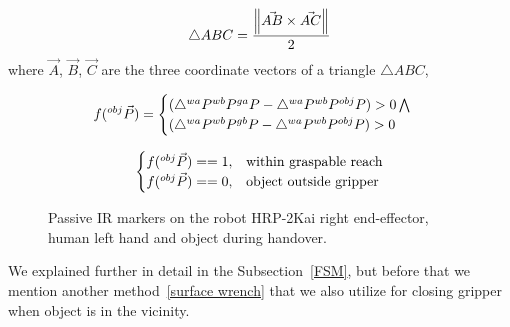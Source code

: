 \documentclass[a4paper, 12pt, oneside]{Thesis}  %
\begin{document}

\begin{equation}\label{area general}
        \triangle{ABC} = \frac{\norm{ \vec{AB} \times \vec{AC} }} {2} \\
\end{equation}
where $\vec{A}$, $\vec{B}$, $\vec{C}$ are the three coordinate vectors of a triangle $\triangle{ABC}$,


\begin{equation}\label{area}
    \centering
    f({}^{obj}\vec{P}) = 
    \begin{cases}
     (\triangle{{}^{wa}P {}^{wb}P {}^{ga}P} - \triangle{{}^{wa}P {}^{wb}P {}^{obj}P}) > 0 \bigwedge \\
     (\triangle{{}^{wa}P {}^{wb}P {}^{gb}P} - \triangle{{}^{wa}P {}^{wb}P {}^{obj}P}) > 0
   \end{cases}         
\end{equation}

\begin{equation}\label{area bool}
    \centering
    \begin{cases}
     f({}^{obj}\vec{P})==1, & \text{within graspable reach}  \\
     f({}^{obj}\vec{P})==0, & \text{object outside gripper}
   \end{cases}         
\end{equation}





\begin{figure}[ht]
	\caption{Passive IR markers on the robot HRP-2Kai right end-effector, human left hand and object during handover.}
	\label{fig:markerEf2}
\end{figure} 

We explained further in detail in the Subsection~\ref{FSM}, but before that we mention another method~\ref{surface wrench} that we also utilize for closing gripper when object is in the vicinity.
\end{document}
